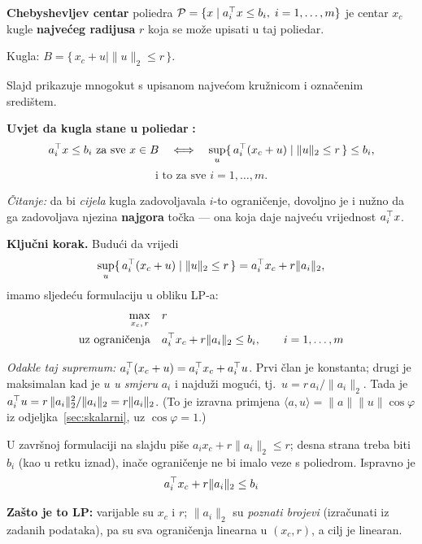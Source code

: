 \begin{definicija}
\textbf{Chebyshevljev centar} poliedra
$\mathcal{P} = \{x \mid a_i\T x \le b_i,\; i = 1,\dots,m\}$ je centar $x_c$
kugle \textbf{najvećeg radijusa} $r$ koja se može upisati u taj poliedar.

Kugla: $B = \{\, x_c + u \mid \|u\|_2 \le r \,\}$.
\end{definicija}

Slajd prikazuje mnogokut s upisanom najvećom kružnicom i označenim središtem.

\textbf{Uvjet da kugla stane u poliedar} \textbf{:}
\[
a_i\T x \le b_i \text{ za sve } x \in B
\quad\Longleftrightarrow\quad
\sup_u \{\, a_i\T(x_c + u) \mid \|u\|_2 \le r \,\} \le b_i ,
\]
\[
\text{i to za sve } i = 1,\dots,m .
\]

\emph{Čitanje:} da bi \emph{cijela} kugla zadovoljavala $i$-to ograničenje,
dovoljno je i nužno da ga zadovoljava njezina \textbf{najgora} točka --- ona
koja daje najveću vrijednost $a_i\T x$.

\textbf{Ključni korak.} Budući da vrijedi
\[
\sup_u \{\, a_i\T(x_c + u) \mid \|u\|_2 \le r \,\} = a_i\T x_c + r\|a_i\|_2,
\]
imamo sljedeću formulaciju u obliku LP-a:
\[
\begin{aligned}
\max_{x_c,\,r} \quad & r \\
\uzogr & a_i\T x_c + r\|a_i\|_2 \le b_i, \qquad i = 1,\dots,m
\end{aligned}
\]

\emph{Odakle taj supremum:} $a_i\T(x_c+u) = a_i\T x_c + a_i\T u$. Prvi član je
konstanta; drugi je maksimalan kad je $u$ \emph{u smjeru} $a_i$ i najduži
mogući, tj.\ $u = r\,a_i/\|a_i\|_2$. Tada je
$a_i\T u = r\,\|a_i\|_2^2/\|a_i\|_2 = r\|a_i\|_2$. \checkmark
(To je izravna primjena $\langle a,u\rangle = \|a\|\|u\|\cos\varphi$ iz
odjeljka~\ref{sec:skalarni}, uz $\cos\varphi = 1$.)

\begin{napomena}
U završnoj formulaciji na slajdu piše
$a_ix_c + r\|a_i\|_2 \le r$; desna strana treba biti $b_i$ (kao u retku iznad),
inače ograničenje ne bi imalo veze s poliedrom. Ispravno je
\[
a_i\T x_c + r\|a_i\|_2 \le b_i
\]
\end{napomena}

\textbf{Zašto je to LP:} varijable su $x_c$ i $r$; $\|a_i\|_2$ su
\emph{poznati brojevi} (izračunati iz zadanih podataka), pa su sva ograničenja
linearna u $(x_c, r)$, a cilj je linearan.


